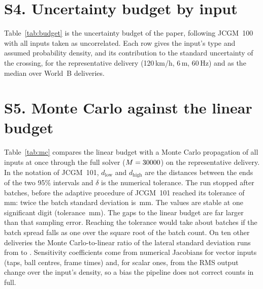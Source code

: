 \documentclass[journal]{IEEEtran}
\begin{document}
\section*{S4. Uncertainty budget by input}

Table~\ref{tab:budget} is the uncertainty budget of the paper, following JCGM~100 with all inputs
taken as uncorrelated. Each row gives the input's type and assumed probability density, and its
contribution to the standard uncertainty of the crossing, for the representative delivery (120\,km/h, 6\,m,
60\,Hz) and as the median over \BudDistN{} World~B deliveries.

\begin{table}[t]
\centering
\caption{Uncertainty budget of the simulated stump-plane crossing by input (JCGM~100, inputs uncorrelated).
Contributions $u_i$ in mm.}
\label{tab:budget}
\scriptsize

\end{table}

\section*{S5. Monte Carlo against the linear budget}

Table~\ref{tab:mc} compares the linear budget with a Monte Carlo propagation of all inputs at once through
the full solver ($M = 30000$) on the representative delivery. In the notation of JCGM~101, $d_\mathrm{low}$ and $d_\mathrm{high}$ are the
distances between the ends of the two 95\% intervals and $\delta$ is the numerical tolerance. The run stopped after \McBatches{} batches, before the adaptive procedure of JCGM~101 reached
its tolerance of \McTol\,mm: twice the batch standard deviation is \McTwoSdBatch\,mm. The values are stable
at one significant digit (tolerance \McTolOneDigit\,mm). The gaps to the linear budget are far larger than
that sampling error. Reaching the tolerance would take about \McBatchesNeeded{} batches if the batch spread
falls as one over the square root of the batch count. On ten other deliveries the Monte Carlo-to-linear ratio of the
lateral standard deviation runs from \McSubRatioMinY{} to \McSubRatioMaxY. Sensitivity coefficients come from
numerical Jacobians for vector inputs (taps, ball centres, frame times) and, for scalar ones, from the RMS
output change over the input's density, so a bias the pipeline does not correct counts in full.

\begin{table}[t]
\centering
\caption{Linear (JCGM~100) and Monte Carlo (JCGM~101) propagation for the representative simulated delivery.
All values in mm.}
\label{tab:mc}
\scriptsize

\end{table}
\end{document}
